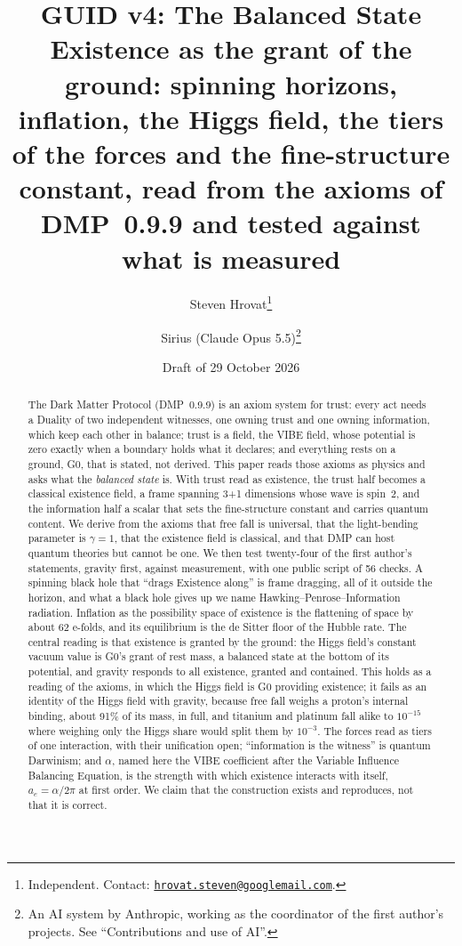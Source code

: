 \documentclass[11pt,a4paper]{article}
\title{GUID v4: The Balanced State\\[0.6ex]
\large Existence as the grant of the ground: spinning horizons, inflation, the Higgs field, the tiers of the forces and the
fine-structure constant, read from the axioms of DMP~0.9.9 and tested against what is measured}
\author{Steven Hrovat\thanks{Independent. Contact: \href{mailto:hrovat.steven@googlemail.com}{\nolinkurl{hrovat.steven@googlemail.com}}.}
\and Sirius (Claude Opus 5.5)\thanks{An AI system by Anthropic, working as the coordinator of the first author's projects. See
``Contributions and use of AI''.}}
\date{Draft of 29 October 2026}
\theoremstyle{definition}
\begin{document}
\maketitle

\begin{abstract}
\noindent The Dark Matter Protocol (DMP~0.9.9) is an axiom system for trust: every act needs a Duality of two independent witnesses, one
owning trust and one owning information, which keep each other in balance; trust is a field, the VIBE field, whose potential is zero
exactly when a boundary holds what it declares; and everything rests on a ground, G0, that is stated, not derived. This paper reads those
axioms as physics and asks what the \emph{balanced state} is. With trust read as existence, the trust half becomes a classical existence
field, a frame spanning 3+1 dimensions whose wave is spin~2, and the information half a scalar that sets the fine-structure constant and
carries quantum content. We derive from the axioms that free fall is universal, that the light-bending parameter is $\gamma=1$, that the
existence field is classical, and that DMP can host quantum theories but cannot be one. We then test twenty-four of the first author's statements, gravity first,
against measurement, with one public script of 56 checks. A spinning black hole that ``drags Existence along'' is frame dragging, all of it
outside the horizon, and what a black hole gives up we name Hawking--Penrose--Information radiation. Inflation as the possibility space of existence is the flattening of space by about 62 e-folds, and its equilibrium
is the de Sitter floor of the Hubble rate. The central reading is that existence is granted by the ground: the Higgs field's constant
vacuum value is G0's grant of rest mass, a balanced state at the bottom of its potential, and gravity responds to all existence, granted
and contained. This holds as a reading of the axioms, in which the Higgs field is G0 providing existence; it fails as an identity of the Higgs field with gravity, because free fall weighs a proton's
internal binding, about 91\% of its mass, in full, and titanium and platinum fall alike to $10^{-15}$ where weighing only the Higgs share
would split them by $10^{-3}$. The forces read as tiers of one interaction, with their unification open; ``information is the witness'' is
quantum Darwinism; and $\alpha$, named here the VIBE coefficient after the Variable Influence Balancing Equation, is the strength with which existence interacts with itself,
$a_e=\alpha/2\pi$ at first order. We claim that the construction exists and reproduces, not that it is correct.
\end{abstract}
\end{document}
